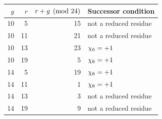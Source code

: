 \begin{tabular}{rrrl}
\toprule $g$ & $r$ & $r+g\pmod{24}$ & Successor condition\\\midrule
10 & 5 & 15 & not a reduced residue\\
10 & 11 & 21 & not a reduced residue\\
10 & 13 & 23 & $\chi_{6}=+1$\\
10 & 19 & 5 & $\chi_{6}=+1$\\
14 & 5 & 19 & $\chi_{6}=+1$\\
14 & 11 & 1 & $\chi_{6}=+1$\\
14 & 13 & 3 & not a reduced residue\\
14 & 19 & 9 & not a reduced residue\\
\bottomrule
\end{tabular}
